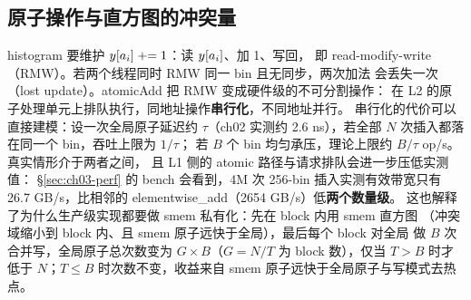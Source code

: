 \subsection{原子操作与直方图的冲突量}

histogram 要维护 $y[a\sb i] \mathrel{+}= 1$：读 $y[a\sb i]$、加 1、写回，
即 read-modify-write（RMW）。若两个线程同时 RMW 同一 bin 且无同步，两次加法
会丢失一次（lost update）。atomicAdd 把 RMW 变成硬件级的不可分割操作：
在 L2 的原子处理单元上排队执行，同地址操作\textbf{串行化}，不同地址并行。
串行化的代价可以直接建模：设一次全局原子延迟约 $\tau$（ch02 实测约
2.6 ns），若全部 $N$ 次插入都落在同一个 bin，吞吐上限为 $1/\tau$；
若 $B$ 个 bin 均匀承压，理论上限约 $B/\tau$ op/s。真实情形介于两者之间，
且 L1 侧的 atomic 路径与请求排队会进一步压低实测值：
\S\ref{sec:ch03-perf} 的 bench 会看到，4M 次 256-bin 插入实测有效带宽只有
26.7 GB/s，比相邻的 elementwise\_add（2654 GB/s）低\textbf{两个数量级}。
这也解释了为什么生产级实现都要做 smem 私有化：先在 block 内用 smem 直方图
（冲突域缩小到 block 内、且 smem 原子远快于全局），最后每个 block 对全局
做 $B$ 次合并写，全局原子总次数变为 $G \times B$（$G = N/T$ 为 block
数），仅当 $T > B$ 时才低于 $N$；$T \le B$ 时次数不变，收益来自 smem
原子远快于全局原子与写模式去热点。

